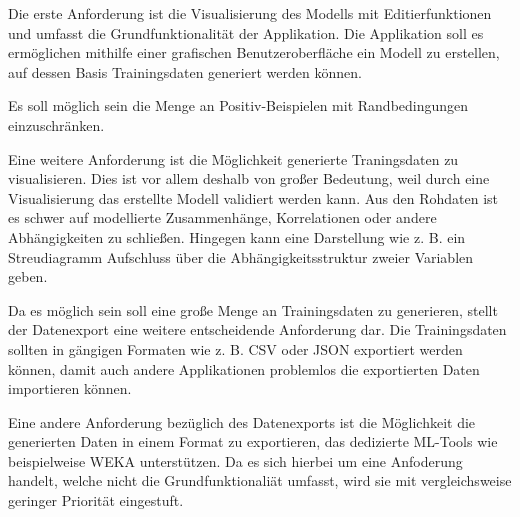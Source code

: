 Die erste Anforderung ist die Visualisierung des Modells mit Editierfunktionen und umfasst die Grundfunktionalität der Applikation. Die Applikation soll es ermöglichen mithilfe einer grafischen Benutzeroberfläche ein Modell zu erstellen, auf dessen Basis Trainingsdaten generiert werden können.

Es soll möglich sein die Menge an Positiv-Beispielen mit Randbedingungen einzuschränken.

Eine weitere Anforderung ist die Möglichkeit generierte Traningsdaten zu visualisieren. Dies ist vor allem deshalb von großer Bedeutung, weil durch eine Visualisierung das erstellte Modell validiert werden kann. Aus den Rohdaten ist es schwer auf modellierte Zusammenhänge, Korrelationen oder andere Abhängigkeiten zu schließen. Hingegen kann eine Darstellung wie z. B. ein Streudiagramm Aufschluss über die Abhängigkeitsstruktur zweier Variablen geben.

Da es möglich sein soll eine große Menge an Trainingsdaten zu generieren, stellt der Datenexport eine weitere entscheidende Anforderung dar. Die Trainingsdaten sollten in gängigen Formaten wie z. B. CSV oder JSON exportiert werden können, damit auch andere Applikationen problemlos die exportierten Daten importieren können.

Eine andere Anforderung bezüglich des Datenexports ist die Möglichkeit die generierten Daten in einem Format zu exportieren, das dedizierte ML-Tools wie beispielweise WEKA unterstützen. Da es sich hierbei um eine Anfoderung handelt, welche nicht die Grundfunktionaliät umfasst, wird sie mit vergleichsweise geringer Priorität eingestuft.

